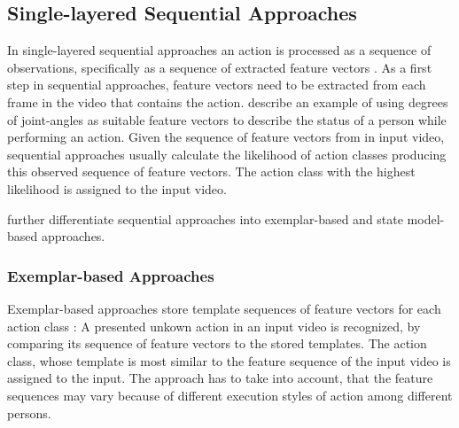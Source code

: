 %


\subsection{Single-layered Sequential Approaches}
In single-layered sequential approaches an action is processed as a sequence of observations, specifically as a sequence of extracted feature vectors \cite{aggarwal_human_2011}.
As a first step in sequential approaches, feature vectors need to be extracted from each frame in the video that contains the action.
\textcite{aggarwal_human_2011} describe an example of using degrees of joint-angles as suitable feature vectors to describe the status of a person while performing an action.
Given the sequence of feature vectors from in input video, sequential approaches usually calculate the likelihood of action classes producing this observed sequence of feature vectors.
The action class with the highest likelihood is assigned to the input video.

\textcite{aggarwal_human_2011} further differentiate sequential approaches into exemplar-based and state model-based approaches.


\subsubsection{Exemplar-based Approaches}
Exemplar-based approaches store template sequences of feature vectors for each action class \cite{aggarwal_human_2011}:
A presented unkown action in an input video is recognized, by comparing its sequence of feature vectors to the stored templates.
The action class, whose template is most similar to the feature sequence of the input video is assigned to the input.
The approach has to take into account, that the feature sequences may vary because of different execution styles of action among different persons.

